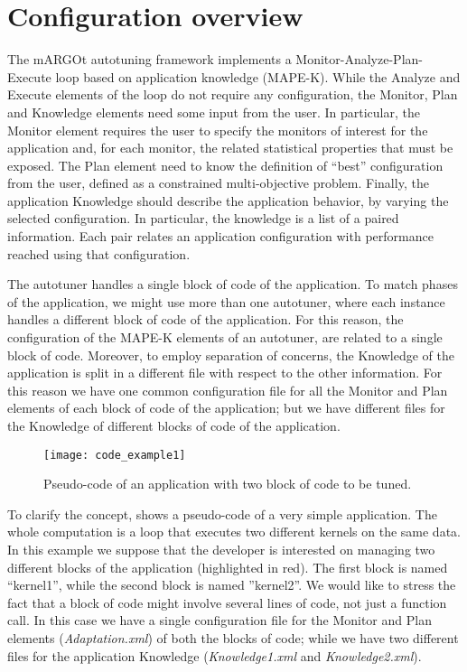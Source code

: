 \section{Configuration overview}
The mARGOt autotuning framework implements a Monitor-Analyze-Plan-Execute loop based on application knowledge (MAPE-K).
While the Analyze and Execute elements of the loop do not require any configuration, the  Monitor, Plan and Knowledge elements need some input from the user.
In particular, the Monitor element requires the user to specify the monitors of interest for the application and, for each monitor, the related statistical properties that must be exposed.
The Plan element need to know the definition of ``best'' configuration from the user, defined as a constrained multi-objective problem.
Finally, the application Knowledge should describe the application behavior, by varying the selected configuration.
In particular, the knowledge is a list of a paired information.
Each pair relates an application configuration with performance reached using that configuration.



The autotuner handles a single block of code of the application.
To match phases of the application, we might use more than one autotuner, where each instance handles a different block of code of the application. 
For this reason, the configuration of the MAPE-K elements of an autotuner, are related to a single block of code.
Moreover, to employ separation of concerns, the Knowledge of the application is split in a different file with respect to the other information.
For this reason we have one common configuration file for all the Monitor and Plan elements of each block of code of the application; but we have different files for the Knowledge of different blocks of code of the application.

\begin{figure}
\centering
\texttt{[image: code\_example1]}
\caption{Pseudo-code of an application with two block of code to be tuned.}
\label{fig:code_example1}
\end{figure}


To clarify the concept,  shows a pseudo-code of a very simple application.
The whole computation is a loop that executes two different kernels on the same data.
In this example we suppose that the developer is interested on managing two different blocks of the application (highlighted in red).
The first block is named ``kernel1'', while the second block is named ''kernel2''.
We would like to stress the fact that a block of code might involve several lines of code, not just a function call.
In this case we have a single configuration file for the Monitor and Plan elements (\textit{Adaptation.xml}) of both the blocks of code; while we have two different files for the application Knowledge (\textit{Knowledge1.xml} and \textit{Knowledge2.xml}).

